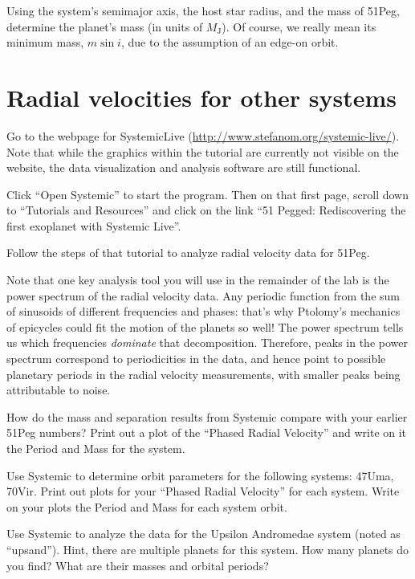\begin{steps}
	\item Using the system's semimajor axis, the host star radius, and the mass of 51Peg, determine the planet’s mass (in units of $M_\textrm{J}$). Of course, we really mean its minimum mass, $m \sin i$, due to the assumption of an edge-on orbit. 
\end{steps}

\section{Radial velocities for other systems}

\begin{steps}
	\item Go to the webpage for SystemicLive (\url{http://www.stefanom.org/systemic-live/}). Note that while the graphics within the tutorial are currently not visible on the website, the data visualization and analysis software are still functional.
	
	\item Click ``Open Systemic'' to start the program. Then on that first page, scroll down to ``Tutorials and Resources'' and click on the link ``51 Pegged: Rediscovering the first exoplanet with Systemic Live''.
	
	\item Follow the steps of that tutorial to analyze radial velocity data for 51Peg.
\end{steps}

Note that one key analysis tool you will use in the remainder of the lab is the power spectrum of the radial velocity data. Any periodic function from the sum of sinusoids of different frequencies and phases: that's why Ptolomy's mechanics of epicycles could fit the motion of the planets so well! The power spectrum tells us which frequencies {\it dominate} that decomposition. Therefore, peaks in the power spectrum correspond to periodicities in the data, and hence point to possible planetary periods in the radial velocity measurements, with smaller peaks being attributable to noise.

\begin{steps}
	\item How do the mass and separation results from Systemic compare with your earlier 51Peg numbers? Print out a plot of the ``Phased Radial Velocity'' and write on it the Period and Mass for the system.
	
	\item Use Systemic to determine orbit parameters for the following systems: 47Uma, 70Vir. Print out plots for your ``Phased Radial Velocity'' for each system. Write on your plots the Period and Mass for each system orbit.
	
	\item Use Systemic to analyze the data for the Upsilon Andromedae system (noted as ``upsand''). Hint, there are multiple planets for this system. How many planets do you find? What are their masses and orbital periods?
	
\end{steps}

